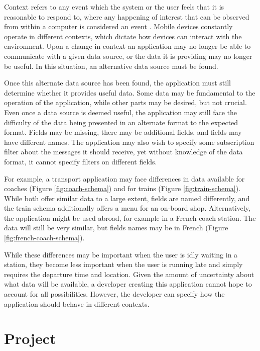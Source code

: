 \documentclass[12pt,twoside,notitlepage]{report}
\begin{document}
Context refers to any event which the system or the user feels that it is reasonable to respond to, where any happening of interest that can be observed from within a computer is considered an event \cite[page 11]{muhl2006distributed}. 
Mobile devices constantly operate in different contexts, which dictate how devices can interact with the environment. 
Upon a change in context an application may no longer be able to communicate with a given data source, or the data it is providing may no longer be useful. 
In this situation, an alternative data source must be found.

Once this alternate data source has been found, the application must still determine whether it provides useful data. 
Some data may be fundamental to the operation of the application, while other parts may be desired, but not crucial.  
Even once a data source is deemed useful, the application may still face the difficulty of the data being presented in an alternate format to the expected format. 
Fields may be missing, there may be additional fields, and fields may have different names. 
The application may also wish to specify some subscription filter about the messages it should receive, yet without knowledge of the data format, it cannot specify filters on different fields.

For example, a transport application may face differences in data available for coaches (Figure \ref{fig:coach-schema}) and for trains (Figure \ref{fig:train-schema}). 
While both offer similar data to a large extent, fields are named differently, and the train schema additionally offers a menu for an on-board shop.
Alternatively, the application might be used abroad, for example in a French coach station. The data will still be very similar, but fields names may be in French (Figure \ref{fig:french-coach-schema}).

While these differences may be important when the user is idly waiting in a station, they become less important when the user is running late and simply requires the departure time and location.
Given the amount of uncertainty about what data will be available, a developer creating this application cannot hope to account for all possibilities. 
However, the developer can specify how the application should behave in different contexts.

\section{Project}
\end{document}
